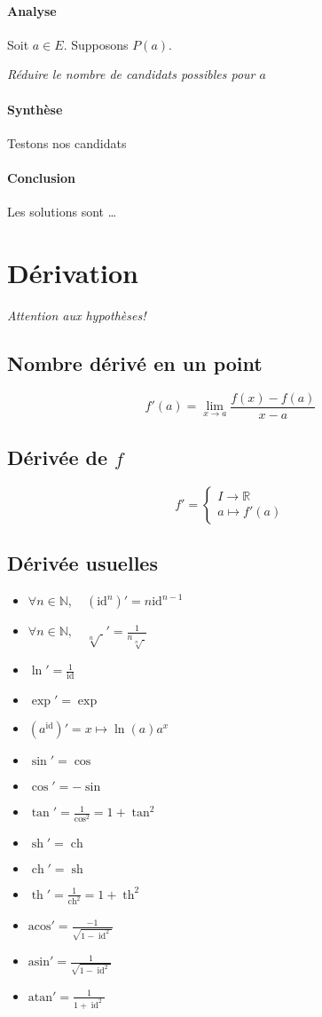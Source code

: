 \documentclass{article}
\newcommand{\R}{{\mathbb R}}
\newcommand{\N}{{\mathbb N}}
\newcommand{\sh}{\operatorname{sh}}
\newcommand{\ch}{\operatorname{ch}}
\renewcommand{\th}{\operatorname{th}}
\newcommand{\id}{\operatorname{id}}
\begin{document}
\paragraph{Analyse}
Soit $a \in E$. Supposons $P(a)$.

\emph{Réduire le nombre de candidats possibles pour $a$} 

\paragraph{Synthèse}
Testons nos candidats

\paragraph{Conclusion}
Les solutions sont \ldots

\newpage
\section{Dérivation}
\emph{Attention aux hypothèses!} 
\subsection{Nombre dérivé en un point}
\[
	f'(a) = \lim_{x \to a} \frac{f(x)-f(a)}{x-a}
\] 

\subsection{Dérivée de $f$}
\[
	f' = \begin{cases}
		I\to \R \\
		a \mapsto f'(a)
	\end{cases}
\] 

\subsection{Dérivée usuelles}
\begin{itemize}
	\item $\forall n \in \N,\quad  (\text{id}^n)' = n \text{id}^{n-1}$
	\item $\forall n \in \N,\quad \sqrt[n]{\;}' = \frac{1}{n\sqrt[n]{\;} }  $ 
	\item $\ln' = \frac{1}{\text{id}}$
	\item $\exp'=\exp$
	\item $(a^\text{id})' = x\mapsto \ln(a)a^x$
	\item $ \sin' = \cos $ 
	\item $\cos' = -\sin$
	\item $\tan' = \frac{1}{\cos^2} = 1 + \tan^2$
	\item $ \sh' = \ch $
	\item $ \ch' = \sh$
	\item $\th' = \frac{1}{\ch^2} = 1 + \th^2$
	\item $\text{acos}' = \frac{-1}{\sqrt{1-\id^2} }$
	\item $\text{asin}' = \frac{1}{\sqrt{1-\id^2} }$
	\item $\text{atan}' = \frac{1}{1 + \id^2}$
\end{itemize}
\end{document}
